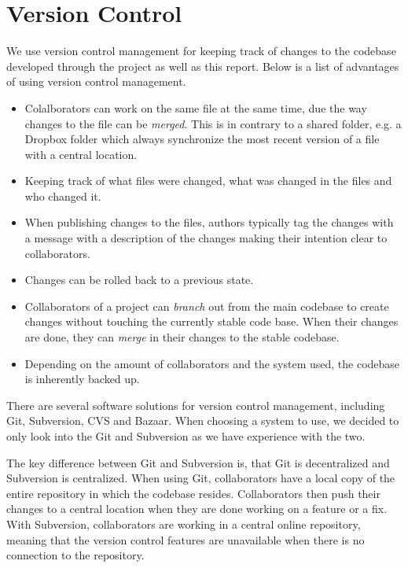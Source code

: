 \section{Version Control}
\label{sec:implementation:version-control}

We use version control management for keeping track of changes to the codebase developed through the project as well as this report. Below is a list of advantages of using version control management.

\begin{itemize}
\item Colalborators can work on the same file at the same time, due the way changes to the file can be \emph{merged}. This is in contrary to a shared folder, e.g. a Dropbox folder which always synchronize the most recent version of a file with a central location.
\item Keeping track of what files were changed, what was changed in the files and who changed it.
\item When publishing changes to the files, authors typically tag the changes with a message with a description of the changes making their intention clear to collaborators.
\item Changes can be rolled back to a previous state.
\item Collaborators of a project can \emph{branch} out from the main codebase to create changes without touching the currently stable code base. When their changes are done, they can \emph{merge} in their changes to the stable codebase.
\item Depending on the amount of collaborators and the system used, the codebase is inherently backed up.
\end{itemize}

There are several software solutions for version control management, including Git, Subversion, CVS and Bazaar. When choosing a system to use, we decided to only look into the Git and Subversion as we have experience with the two.

The key difference between Git and Subversion is, that Git is decentralized and Subversion is centralized. When using Git, collaborators have a local copy of the entire repository in which the codebase resides. Collaborators then push their changes to a central location when they are done working on a feature or a fix. With Subversion, collaborators are working in a central online repository, meaning that the version control features are unavailable when there is no connection to the repository.

